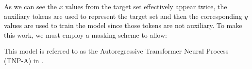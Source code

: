\documentclass[main.tex]{subfiles}
\begin{document}
As we can see the $x$ values from the target set effectively appear twice, the auxiliary tokens are used to represent the target set and then the corresponding $y$ values are used to train the model since those tokens are not auxiliary. To make this work, we must employ a masking scheme to allow:


This model is referred to as the Autoregressive Transformer Neural Process (TNP-A) in \cite{nguyen2023transformer}.

\ifSubfilesClassLoaded{%
    \printbibliography{}
}{} 
\end{document}
